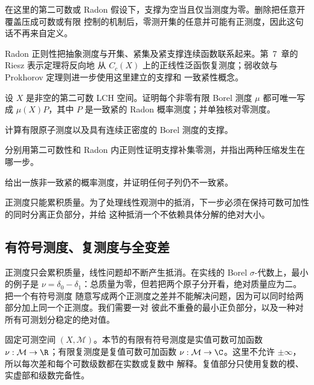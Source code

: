 \begin{remark}
在这里的第二可数或 Radon 假设下，支撑为空当且仅当测度为零。删除把任意开覆盖压成可数或有限
控制的机制后，零测开集的任意并可能有正测度，因此这句话不再来自定义。
\end{remark}

Radon 正则性把抽象测度与开集、紧集及紧支撑连续函数联系起来。第~7~章的 Riesz 表示定理将反向地
从 \(C_c(X)\) 上的正线性泛函恢复测度；弱收敛与 Prokhorov 定理则进一步使用这里建立的支撑和
一致紧性概念。

\begin{exercise}
设 $X$ 是非空的第二可数 LCH 空间。证明每个非零有限 Borel 测度 $\mu$ 都可唯一写成
$\mu(X)P$，其中 $P$ 是一致紧的 Radon 概率测度；并单独核对零测度。
\end{exercise}
\begin{exercise}
计算有限原子测度以及具有连续正密度的 Borel 测度的支撑。
\end{exercise}
\begin{exercise}
分别用第二可数性和 Radon 内正则性证明支撑补集零测，并指出两种压缩发生在哪一步。
\end{exercise}
\begin{exercise}
给出一族非一致紧的概率测度，并证明任何子列仍不一致紧。
\end{exercise}

正测度只能累积质量。为了处理线性观测中的抵消，下一步必须在保持可数可加性的同时分离正负部分，并给
这种抵消一个不依赖具体分解的绝对大小。

\subsection{有符号测度、复测度与全变差}\label{subsec:2-2-3}

正测度只会累积质量，线性问题却不断产生抵消。在实线的 Borel $\sigma$-代数上，最小的例子是
$\nu=\delta_0-\delta_1$：总质量为零，但若把两个原子分开看，绝对质量应为二。把一个有符号测度
随意写成两个正测度之差并不能解决问题，因为可以同时给两部分加上同一个正测度。我们需要一对
彼此不重叠的最小正负部分，以及一种对所有可测划分稳定的绝对值。

\begin{definition}[有限有符号测度与有限复测度]\label{def:2-2-3-1}
固定可测空间 $(X,\mathcal M)$。本节的有限有符号测度是实值可数可加函数
$\nu:\mathcal M\to\R$；有限复测度是复值可数可加函数
$\nu:\mathcal M\to\C$。这里不允许 $\pm\infty$，所以每次差和每个可数级数都在实数或复数中
解释。复值部分只使用复数的模、实虚部和级数完备性。
\end{definition}

